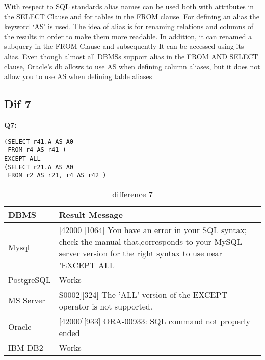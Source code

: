 With respect to SQL standards alias names can be used both with attributes in the SELECT Clause and for tables in the FROM clause. For defining an alias the keyword ‘AS’ is used. The idea of alias is for renaming relations and columns of the results in order to make them more readable. In addition, it can renamed a subquery in the FROM Clause and subsequently It can be accessed using its alias. Even though almost all DBMSs support alias in the FROM AND SELECT clause, Oracle’s db  allows to use AS when defining column aliases, but it does not allow you to use AS when defining table aliases 


\subsection{Dif 7}
  
\textbf{Q7:}
\begin{mdframed}[backgroundcolor=lightgray!20]
\begin{lstlisting}[style=SQL]
(SELECT r41.A AS A0
 FROM r4 AS r41 ) 
EXCEPT ALL
(SELECT r21.A AS A0
 FROM r2 AS r21, r4 AS r42 )
\end{lstlisting}
\end{mdframed}

\begin{table}[h]
\centering
\caption{difference 7}
\label{my-label}
\begin{tabular}{|p{2cm}|p{11.5cm}| }
\hline
\textbf{DBMS} & \textbf{Result Message}                                                                                                                                                 \\ \hline
Mysql         & {[}42000{]}{[}1064{]} You have an error in your SQL syntax; check the manual that,corresponds to your MySQL server version for the right syntax to use near 'EXCEPT ALL \\ \hline
PostgreSQL    & Works                                                                                                                                                                   \\ \hline
MS Server     & S0002{]}{[}324{]} The 'ALL' version of the EXCEPT operator is not supported.                                                                                            \\ \hline
Oracle        & {[}42000{]}{[}933{]} ORA-00933: SQL command not properly ended                                                                                                          \\ \hline
IBM DB2       & Works                                                                                                                                                                   \\ \hline
\end{tabular}
\end{table}


